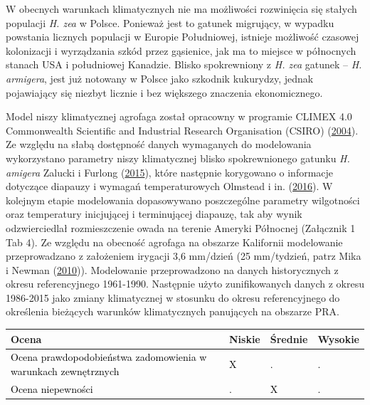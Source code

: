 \documentclass[polish,a4paper]{article}
\begin{document}
W obecnych warunkach klimatycznych nie ma możliwości rozwinięcia się
stałych populacji \emph{H. zea} w Polsce. Ponieważ jest to gatunek
migrujący, w wypadku powstania licznych populacji w Europie Południowej,
istnieje możliwość czasowej kolonizacji i wyrządzania szkód przez
gąsienice, jak ma to miejsce w północnych stanach USA i południowej
Kanadzie. Blisko spokrewniony z \emph{H. zea} gatunek -- \emph{H.
armigera}, jest już notowany w Polsce jako szkodnik kukurydzy, jednak
pojawiający się niezbyt licznie i bez większego znaczenia ekonomicznego.

Model niszy klimatycznej agrofaga został opracowny w programie CLIMEX
4.0 Commonwealth Scientific and Industrial Research Organisation (CSIRO)
(\protect\hyperlink{ref-csiro2004}{2004}). Ze względu na słabą
dostępność danych wymaganych do modelowania wykorzystano parametry niszy
klimatycznej blisko spokrewnionego gatunku \emph{H. amigera} Zalucki i
Furlong (\protect\hyperlink{ref-zalucki2005}{2015}), które następnie
korygowano o informacje dotyczące diapauzy i wymagań temperaturowych
Olmstead i in. (\protect\hyperlink{ref-olmstead2016}{2016}). W kolejnym
etapie modelowania dopasowywano poszczególne parametry wilgotności oraz
temperatury inicjującej i terminującej diapauzę, tak aby wynik
odzwierciedlał rozmieszczenie owada na terenie Ameryki Północnej
(Załącznik 1 Tab 4). Ze względu na obecność agrofaga na obszarze
Kalifornii modelowanie przeprowadzano z założeniem irygacji 3,6 mm/dzień
(25 mm/tydzień, patrz Mika i Newman
(\protect\hyperlink{ref-mika2010}{2010})). Modelowanie przeprowadzono na
danych historycznych z okresu referencyjnego 1961-1990. Następnie użyto
zunifikowanych danych z okresu 1986-2015 jako zmiany klimatycznej w
stosunku do okresu referencyjnego do określenia bieżących warunków
klimatycznych panujących na obszarze PRA.

\begin{tabu} to 
\toprule
{}  \textbf{Ocena} & \textbf{Niskie} & \textbf{Średnie} & \textbf{Wysokie}\\
\midrule
{}  \textcolor{black}{Ocena prawdopodobieństwa zadomowienia w warunkach zewnętrznych} & \textcolor{black}{X} & \textcolor{black}{.} & \textcolor{black}{.}\\
  \textcolor{black}{Ocena niepewności} & \textcolor{black}{.} & \textcolor{black}{X} & \textcolor{black}{.}\\
\bottomrule
\end{tabu}
\end{document}
